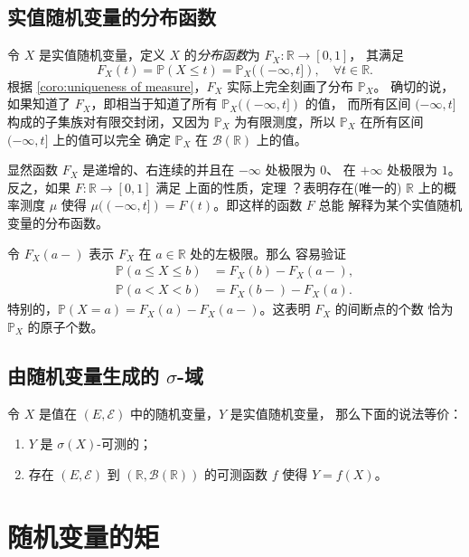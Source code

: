 \documentclass[fontset=none]{Notes}
\begin{document}
\subsection{实值随机变量的分布函数}

令 $X$ 是实值随机变量，定义 $X$ 的\emph{分布函数}为 $F_X:\mathbb{R}\to [0,1]$，
其满足
\[
  F_X(t)=\mathbb{P}(X\leq t)=\mathbb{P}_X((-\infty,t]),\quad \forall t\in \mathbb{R}.  
\]
根据 \autoref{coro:uniqueness of measure}，$F_X$ 实际上完全刻画了分布 $\mathbb{P}_X$。
确切的说，如果知道了 $F_X$，即相当于知道了所有 $\mathbb{P}_X((-\infty,t])$ 的值，
而所有区间 $(-\infty,t]$ 构成的子集族对有限交封闭，又因为 $\mathbb{P}_X$
为有限测度，所以 $\mathbb{P}_X$ 在所有区间 $(-\infty,t]$ 上的值可以完全
确定 $\mathbb{P}_X$ 在 $\mathcal{B}(\mathbb{R})$ 上的值。

显然函数 $F_X$ 是递增的、右连续的并且在 $-\infty$ 处极限为 $0$、
在 $+\infty$ 处极限为 $1$。反之，如果 $F:\mathbb{R}\to [0,1]$ 满足
上面的性质，定理 ？表明存在(唯一的) $\mathbb{R}$ 上的概率测度
$\mu$ 使得 $\mu((-\infty,t])=F(t)$。即这样的函数 $F$ 总能
解释为某个实值随机变量的分布函数。

令 $F_X(a-)$ 表示 $F_X$ 在 $a\in \mathbb{R}$ 处的左极限。那么
容易验证
\begin{align*}
  \mathbb{P}(a\leq X\leq b)&=F_X(b)-F_X(a-),\\
  \mathbb{P}(a<X<b)&=F_X(b-)-F_X(a).
\end{align*}
特别的，$\mathbb{P}(X=a)=F_X(a)-F_X(a-)$。这表明 $F_X$ 的间断点的个数
恰为 $\mathbb{P}_X$ 的原子个数。

\subsection{由随机变量生成的 $\sigma$-域}

\begin{proposition}\label{prop:sigmaX-measurable}
  令 $X$ 是值在 $(E,\mathcal{E})$ 中的随机变量，$Y$ 是实值随机变量，
  那么下面的说法等价：
  \begin{enumerate}
    \item $Y$ 是 $\sigma(X)$-可测的；
    \item 存在 $(E,\mathcal{E})$ 到 $(\mathbb{R},\mathcal{B}(\mathbb{R}))$
    的可测函数 $f$ 使得 $Y=f(X)$。
  \end{enumerate}
\end{proposition}


\section{随机变量的矩}
\end{document}
